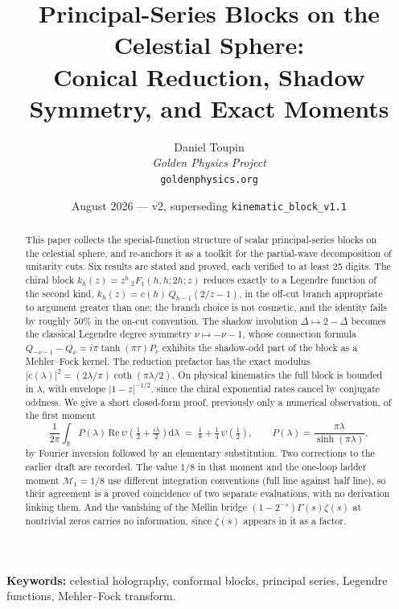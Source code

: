 \documentclass[12pt,a4paper]{article}
\title{Principal-Series Blocks on the Celestial Sphere:\\[4pt]
Conical Reduction, Shadow Symmetry, and Exact Moments}
\author{Daniel Toupin\\[4pt]
\textit{Golden Physics Project}\\[2pt]
\texttt{goldenphysics.org}}
\date{August 2026 --- v2, superseding \texttt{kinematic\_block\_v1.1}}
\theoremstyle{plain}
\theoremstyle{definition}
\theoremstyle{remark}
\newcommand{\R}{\mathbb{R}}
\newcommand{\dd}{\mathrm{d}}
\begin{document}
\maketitle

\begin{abstract}
\noindent
This paper collects the special-function structure of scalar
principal-series blocks on the celestial sphere, and re-anchors it as a
toolkit for the partial-wave decomposition of unitarity cuts. Six
results are stated and proved, each verified to at least 25 digits.
The chiral block $k_h(z)=z^h\,{}_2F_1(h,h;2h;z)$ reduces exactly to a
Legendre function of the second kind, $k_h(z)=c(h)\,Q_{h-1}(2/z-1)$,
in the off-cut branch appropriate to argument greater than one; the
branch choice is not cosmetic, and the identity fails by roughly $50\%$
in the on-cut convention. The shadow involution $\Delta\mapsto
2-\Delta$ becomes the classical Legendre degree symmetry
$\nu\mapsto-\nu-1$, whose connection formula
$Q_{-\nu-1}-Q_\nu=i\pi\tanh(\pi\tau)P_\nu$ exhibits the shadow-odd part
of the block as a Mehler--Fock kernel. The reduction prefactor has the
exact modulus $|c(\lambda)|^2=(2\lambda/\pi)\coth(\pi\lambda/2)$. On
physical kinematics the full block is bounded in $\lambda$, with
envelope $|1-z|^{-1/2}$, since the chiral exponential rates cancel by
conjugate oddness. We give a short closed-form proof, previously only a
numerical observation, of the first moment
\[
\frac{1}{2\pi}\int_{\R} P(\lambda)\,
\mathrm{Re}\,\psi\!\left(\tfrac12+\tfrac{i\lambda}{2}\right)\dd\lambda
\;=\;\tfrac18+\tfrac14\,\psi(\tfrac12),
\qquad
P(\lambda)=\frac{\pi\lambda}{\sinh(\pi\lambda)} ,
\]
by Fourier inversion followed by an elementary substitution.
Two corrections to the earlier draft are recorded. The value $1/8$ in
that moment and the one-loop ladder moment $\mathcal M_1=1/8$ use
different integration conventions (full line against half line), so
their agreement is a proved coincidence of two separate evaluations,
with no derivation linking them. And the vanishing of the Mellin bridge
$(1-2^{-s})\Gamma(s)\zeta(s)$ at nontrivial zeros carries no
information, since $\zeta(s)$ appears in it as a factor.
\end{abstract}

\medskip
\noindent\textbf{Keywords:} celestial holography, conformal blocks,
principal series, Legendre functions, Mehler--Fock transform.

\tableofcontents
\newpage

\end{document}
